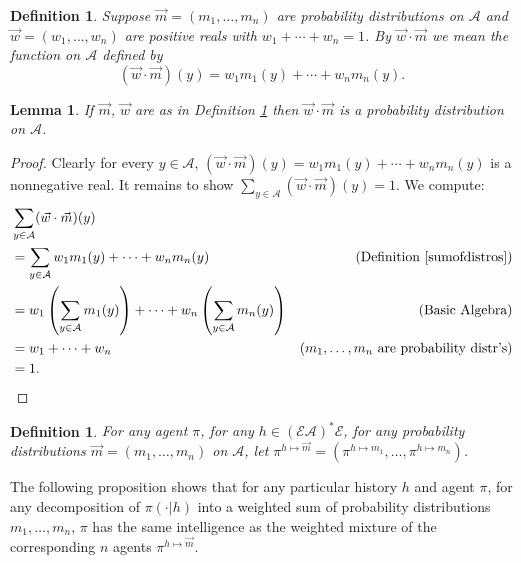 \documentclass[twoside]{article}
\newtheorem{definition}[theorem]{Definition}
\newtheorem{lemma}[theorem]{Lemma}
\begin{document}
\begin{definition}
\label{sumofdistros}
    Suppose $\vec m=(m_1,\ldots,m_n)$ are probability distributions on $\mathcal A$
    and $\vec w=(w_1,\ldots,w_n)$ are positive reals with
    $w_1+\cdots+w_n=1$. By $\vec w\cdot\vec m$ we mean the function
    on $\mathcal A$ defined by
    \[
        (\vec w\cdot\vec m)(y) = w_1m_1(y) + \cdots + w_nm_n(y).
    \]
\end{definition}

\begin{lemma}
    If $\vec m$, $\vec w$ are as in Definition \ref{sumofdistros}
    then $\vec w\cdot\vec m$ is a probability distribution on $\mathcal A$.
\end{lemma}

\begin{proof}
    Clearly for every $y\in\mathcal A$,
    $(\vec w\cdot\vec m)(y) = w_1m_1(y) + \cdots + w_nm_n(y)$ is a nonnegative
    real. It remains to show $\sum_{y\in\mathcal A}(\vec w\cdot\vec m)(y)=1$.
    We compute:
    \begin{align*}
        &{} \sum_{y\in\mathcal A}(\vec w\cdot\vec m)(y)\\
        &=
        \sum_{y\in\mathcal A} w_1m_1(y) + \cdots + w_nm_n(y)
            &\mbox{(Definition \ref{sumofdistros})}\\
        &=
        w_1\left(\sum_{y\in\mathcal A} m_1(y)\right)
        + \cdots + w_n\left(\sum_{y\in\mathcal A}m_n(y)\right)
            &\mbox{(Basic Algebra)}\\
        &= w_1 + \cdots + w_n
            &\mbox{($m_1,\ldots,m_n$ are probability distr's)}\\
        &= 1.
    \end{align*}
\end{proof}

\begin{definition}
    For any agent $\pi$, for any $h\in(\mathcal E\mathcal A)^*\mathcal E$,
    for any probability distributions $\vec m=(m_1,\ldots,m_n)$ on $\mathcal A$,
    let $\pi^{h\mapsto \vec m}=(\pi^{h\mapsto m_1},\ldots,\pi^{h\mapsto m_n})$.
\end{definition}

The following proposition shows that
for any particular history $h$ and agent $\pi$,
for any decomposition of $\pi(\cdot|h)$ into a weighted sum
of probability distributions $m_1,\ldots,m_n$,
$\pi$ has the same intelligence as the weighted mixture of the corresponding $n$ agents
$\pi^{h\mapsto \vec m}$.
\end{document}
